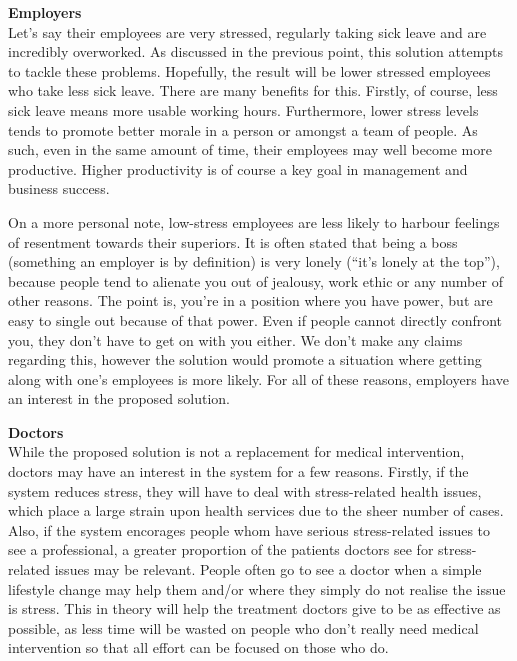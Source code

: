 \documentclass{scrartcl}
\begin{document}
\textbf{Employers}\\
Let's say their employees are very stressed, regularly taking sick leave and
are incredibly overworked. As discussed in the previous point, this solution attempts to tackle these problems. Hopefully, the
result will be lower stressed employees who take less sick leave. There are many benefits for this. Firstly, of course, less sick
leave means more usable working hours. Furthermore, lower stress levels tends to promote better morale in a person or amongst
a team of people. As such, even in the same amount of time, their employees may well become more productive. Higher productivity
is of course a key goal in management and business success.

On a more personal note, low-stress employees are less likely to
harbour feelings of resentment towards their superiors. It is often stated that being a boss (something an employer is by definition)
is very lonely (``it's lonely at the top''), because people tend to alienate you out of jealousy, work ethic or any number of
other reasons. The point is, you're in a position where you have power, but are easy to single out because of that power.
Even if people cannot directly confront you, they don't have to get on with you either. We don't make any claims regarding this,
however the solution would promote a situation where getting along with one's employees is more likely. For all of these reasons,
employers have an interest in the proposed solution.

\textbf{Doctors}\\
While the proposed solution is not a replacement for medical intervention, doctors may have an interest in the system
for a few reasons. Firstly, if the system reduces stress, they will have to deal with stress-related health issues,
which place a large strain upon health services due to the
sheer number of cases.
Also, if the system encorages people whom have serious stress-related issues
to see a professional, a greater proportion of the patients doctors see for stress-related issues may be relevant. People
often go to see a doctor when a simple lifestyle change may help them and/or where they
simply do not realise the issue is stress. This in theory will help the treatment doctors give to be as effective as possible, as
less time will be wasted on people who don't really need medical intervention so that all effort can be focused on those who do.
\end{document}
